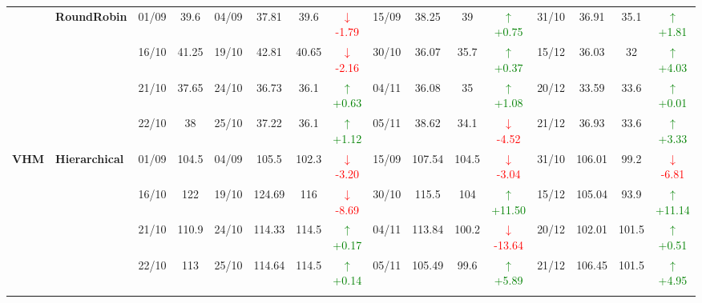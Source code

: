 {\begin{longtable}{llcc|cccc|cccc|cccc}
& \textbf{RoundRobin}
& 01/09 & 39.6 & 04/09 & 37.81 & 39.6 & \textcolor{red}{\(\downarrow\)-1.79} & 15/09 & 38.25 & 39 & \textcolor{green}{\(\uparrow\)+0.75} & 31/10 & 36.91 & 35.1 & \textcolor{green}{\(\uparrow\)+1.81} \\

&
& 16/10 & 41.25 & 19/10 & 42.81 & 40.65 & \textcolor{red}{\(\downarrow\)-2.16} & 30/10 & 36.07 & 35.7 & \textcolor{green}{\(\uparrow\)+0.37} & 15/12 & 36.03 & 32 & \textcolor{green}{\(\uparrow\)+4.03} \\

&
& 21/10 & 37.65 & 24/10 & 36.73 & 36.1 & \textcolor{green}{\(\uparrow\)+0.63} & 04/11 & 36.08 & 35 & \textcolor{green}{\(\uparrow\)+1.08} & 20/12 & 33.59 & 33.6 & \textcolor{green}{\(\uparrow\)+0.01} \\

&
& 22/10 & 38 & 25/10 & 37.22 & 36.1 & \textcolor{green}{\(\uparrow\)+1.12} & 05/11 & 38.62 & 34.1 & \textcolor{red}{\(\downarrow\)-4.52} & 21/12 & 36.93 & 33.6 & \textcolor{green}{\(\uparrow\)+3.33} \\
\midrule




\multirow{12}{*}{\textbf{VHM}} 
& \textbf{Hierarchical}
& 01/09 & 104.5 & 04/09 & 105.5 & 102.3 & \textcolor{red}{\(\downarrow\)-3.20} & 15/09 & 107.54 & 104.5 & \textcolor{red}{\(\downarrow\)-3.04} & 31/10 & 106.01 & 99.2 & \textcolor{red}{\(\downarrow\)-6.81} \\

&
& 16/10 & 122 & 19/10 & 124.69 & 116 & \textcolor{red}{\(\downarrow\)-8.69} & 30/10 & 115.5 & 104 & \textcolor{green}{\(\uparrow\)+11.50} & 15/12 & 105.04 & 93.9 & \textcolor{green}{\(\uparrow\)+11.14} \\

&
& 21/10 & 110.9 & 24/10 & 114.33 & 114.5 & \textcolor{green}{\(\uparrow\)+0.17} & 04/11 & 113.84 & 100.2 & \textcolor{red}{\(\downarrow\)-13.64} & 20/12 & 102.01 & 101.5 & \textcolor{green}{\(\uparrow\)+0.51} \\

&
& 22/10 & 113 & 25/10 & 114.64 & 114.5 & \textcolor{green}{\(\uparrow\)+0.14} & 05/11 & 105.49 & 99.6 & \textcolor{green}{\(\uparrow\)+5.89} & 21/12 & 106.45 & 101.5 & \textcolor{green}{\(\uparrow\)+4.95} \\
\cmidrule(lr){2-16}



\end{longtable}}
